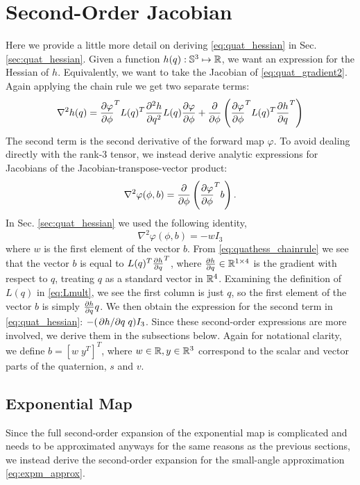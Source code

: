 \documentclass[../root.tex]{subfiles}
\begin{document}
\section{Second-Order Jacobian}
Here we provide a little more detail on deriving \eqref{eq:quat_hessian} in 
Sec. \ref{sec:quat_hessian}. Given a function $h(q) : \mathbb{S}^3 \mapsto \mathbb{R}$, we want 
an expression for the Hessian of $h$. Equivalently, we want to take the 
Jacobian of \eqref{eq:quat_gradient2}. Again applying the chain rule we get two
separate terms:
\begin{equation} \label{eq:quathess_chainrule}
    \nabla^2 h(q) = \pdv{\varphi}{\phi}^T L(q)^T \pdv[2]{h}{q} L(q) \pdv{\varphi}{\phi}
        + \pdv{}{\phi} \left( \pdv{\varphi}{\phi}^T L(q)^T \pdv{h}{q}^T \right)
\end{equation}
The second term is the second derivative of the forward map $\varphi$. To avoid 
dealing directly with the rank-3 tensor, we instead derive analytic expressions 
for Jacobians of the Jacobian-transpose-vector product:
\begin{equation}
    \nabla^2 \varphi(\phi, b) = \pdv{}{\phi} \left( \pdv{\varphi}{\phi}^T b \right).
\end{equation}
In Sec. \ref{sec:quat_hessian} we used the following identity, 
\begin{equation}
    \nabla^2 \varphi(\phi, b) = - w I_3
\end{equation}
where $w$ is the first element of the vector $b$. From
\eqref{eq:quathess_chainrule} we see that the vector $b$ is equal to $L(q)^T
\pdv{h}{q}^T$, where $\pdv{h}{q} \in \mathbb{R}^{1\times4}$ is the gradient with respect 
to $q$, treating $q$ as a standard vector in $\mathbb{R}^4$. Examining the definition 
of $L(q)$ in \eqref{eq:Lmult}, we see the first column is just $q$, so the 
first element of the vector $b$ is simply $\pdv{h}{q} q$. We then obtain the 
expression for the second term in \eqref{eq:quat_hessian}: $-(\pdv*{h}{q} q) I_3$.
Since these second-order expressions are more involved, we derive them in the 
subsections below. Again for notational clarity, we define $b = [w \; y^T]^T$, 
where $w \in \mathbb{R}, y \in \mathbb{R}^3$ correspond to the scalar and vector parts of the 
quaternion, $s$ and $v$.

\subsection{Exponential Map}
Since the full second-order expansion of the exponential map is complicated and 
needs to be approximated anyways for the same reasons as the previous sections,
we instead derive the second-order expansion for the small-angle approximation
\eqref{eq:expm_approx}.
\end{document}
